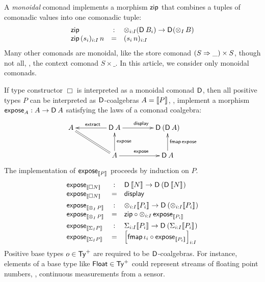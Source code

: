 \documentclass[acmsmall,review,anonymous]{acmart}\settopmatter{printfolios=true,printccs=false,printacmref=false}
\theoremstyle{remark}
\begin{document}
A \emph{monoidal} comonad implements a morphism $\tzip$ that combines
a tuples of comonadic values into one comonadic tuple:
\[
\begin{array}{lcl}
  \tzip & : & \tupt {i:I} {(\D\,B_i)} \to \D(\tupt I B) \\
  \tzip\,(s_i)_{i:I}\,n & = & (s_i\,n)_{i:I} \\
\end{array}
\]
Many other comonads are monoidal,
like the store comonad $(S \To \_) \times S$,
though not all, \eg, the context comonad $S{\times}\_$.
In this article, we consider only monoidal comonads.

If type constructor $\Box$ is interpreted as a monoidal comonad $\D$,
then all positive types $P$ can be interpreted as $\D$-coalgebras
$A = \den P$, \ie, implement a morphism $\expose[A] : A \to \D\,A$
satisfying the laws of a comonad coalgebra:
\[
\xymatrix@C=10ex{
A  \ar@{=}[dr]
  & \D\,A \ar[l]_{\textract} \ar[r]^{\tdisplay}
  & \D\,(\D\,A)
\\
  & A \ar[u]_{\texpose} \ar[r]^{\texpose}
  & \D\,A \ar[u]_{\tfmap\,\texpose}
}
\]
The implementation of $\expose[\den P]$ proceeds by induction on $P$.
\[
\begin{array}{lcl}
  \expose[\den{\Box N}] & : & {\D\,\den N} \to {\D\,(\D\,\den N)} \\
  \expose[\den{\Box N}] & = & \display
\\[1ex]
  \expose[\den{\tupt I P}] & : & \tupt {i:I} {\den{P_i}} \to \D\,(\tupt {i:I} {\den{P_i}}) \\
  \expose[\den{\tupt I P}] & = & \tzip \comp \tupt {i:I} \expose[\den{P_i}]
\\[1ex]
  \expose[\den{\sumt I P}] & : & \sumt {i:I} {\den{P_i}} \to \D\,(\sumt {i:I} {\den{P_i}}) \\
  \expose[\den{\sumt I P}] & = & \left[\tfmap\,\iota_i \comp \expose[\den{P_i}]\right]_{i:I} \\
\end{array}
\]
Positive base types $o \in \PTy$ are required to be $\D$-coalgebras.
For instance, elements of a base type like
$\Float \in \PTy$ could represent streams of floating point numbers,
\eg, continuous measurements from a sensor.
\end{document}

